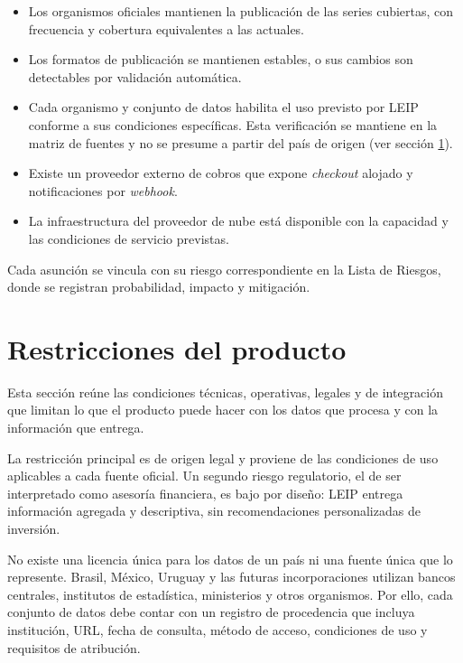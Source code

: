 \documentclass[11pt,a4paper]{article}
\newcommand{\proyectoNombre}{LEIP}
\begin{document}
\begin{itemize}
  \item Los organismos oficiales mantienen la publicaci\'on de las series
        cubiertas, con frecuencia y cobertura equivalentes a las actuales.
  \item Los formatos de publicaci\'on se mantienen estables, o sus cambios son
        detectables por validaci\'on autom\'atica.
  \item Cada organismo y conjunto de datos habilita el uso previsto por
        \proyectoNombre{} conforme a sus condiciones espec\'ificas. Esta
        verificaci\'on se mantiene en la matriz de fuentes y no se presume a
        partir del pa\'is de origen (ver secci\'on \ref{sec:restricciones}).
  \item Existe un proveedor externo de cobros que expone \emph{checkout} alojado
        y notificaciones por \emph{webhook}.
  \item La infraestructura del proveedor de nube est\'a disponible con la
        capacidad y las condiciones de servicio previstas.
\end{itemize}

Cada asunci\'on se vincula con su riesgo correspondiente en la Lista de
Riesgos, donde se registran probabilidad, impacto y mitigaci\'on.

\section{Restricciones del producto}
\label{sec:restricciones}

Esta secci\'on re\'une las condiciones t\'ecnicas, operativas, legales y de
integraci\'on que limitan lo que el producto puede hacer con los datos que
procesa y con la informaci\'on que entrega.

La restricci\'on principal es de origen legal y proviene de las condiciones de
uso aplicables a cada fuente oficial. Un segundo riesgo regulatorio, el de ser
interpretado como asesor\'ia financiera, es bajo por dise\~no:
\proyectoNombre{} entrega informaci\'on agregada y descriptiva, sin
recomendaciones personalizadas de inversi\'on.

No existe una licencia \'unica para los datos de un pa\'is ni una fuente
\'unica que lo represente. Brasil, M\'exico, Uruguay y las futuras
incorporaciones utilizan bancos centrales, institutos de estad\'istica,
ministerios y otros organismos. Por ello, cada conjunto de datos debe contar
con un registro de procedencia que incluya instituci\'on, URL, fecha de
consulta, m\'etodo de acceso, condiciones de uso y requisitos de atribuci\'on.
\end{document}
